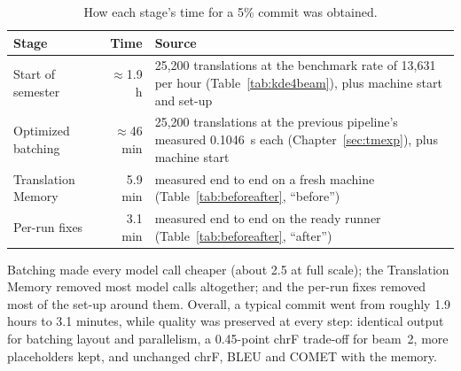 \begin{table}[H]
\centering
\caption[Sources of the trajectory times]{How each stage's time for a 5\% commit was obtained.}
\label{tab:trajectory}
\begin{tabularx}{\linewidth}{@{}l r L@{}}
\toprule
\textbf{Stage} & \textbf{Time} & \textbf{Source} \\
\midrule
Start of semester & $\approx$1.9 h & 25,200 translations at the benchmark rate of 13,631 per hour (Table~\ref{tab:kde4beam}), plus machine start and set-up \\
Optimized batching & $\approx$46 min & 25,200 translations at the previous pipeline's measured 0.1046~s each (Chapter~\ref{sec:tmexp}), plus machine start \\
Translation Memory & 5.9 min & measured end to end on a fresh machine (Table~\ref{tab:beforeafter}, ``before'') \\
Per-run fixes & 3.1 min & measured end to end on the ready runner (Table~\ref{tab:beforeafter}, ``after'') \\
\bottomrule
\end{tabularx}
\end{table}

Batching made every model call cheaper (about 2.5\x{} at full scale); the Translation Memory removed most model calls
altogether; and the per-run fixes removed most of the set-up around them. Overall, a typical commit went from roughly
1.9 hours to 3.1 minutes, while quality was preserved at every step: identical output for batching layout and parallelism,
a 0.45-point chrF trade-off for beam~2, more placeholders kept, and unchanged chrF, BLEU and COMET with the memory.
